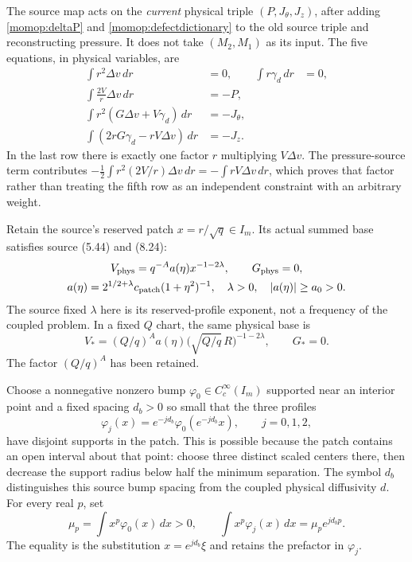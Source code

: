 \documentclass[11pt]{article}
\begin{document}
The source map acts on the \emph{current} physical triple
$(P,J_\theta,J_z)$, after adding \eqref{momop:deltaP} and
\eqref{momop:defectdictionary} to the old source triple and
reconstructing pressure. It does not take
$(M_2,M_1)$ as its input. The five equations, in physical variables, are
\begin{align}
 \int r^2\Delta v\,dr&=0,&
 \int r\gamma_d\,dr&=0,\nonumber\\
 \int\frac{2V}{r}\Delta v\,dr&=-P,\nonumber\\
 \int r^2(G\Delta v+V\gamma_d)\,dr&=-J_\theta,\nonumber\\
 \int(2rG\gamma_d-rV\Delta v)\,dr&=-J_z .
 \label{momop:fivephysical}
\end{align}
In the last row there is exactly one factor $r$ multiplying $V\Delta v$.
The pressure-source term contributes
$-\tfrac12\int r^2(2V/r)\Delta v\,dr=-\int rV\Delta v\,dr$,
which proves that factor rather than treating the fifth row as an
independent constraint with an arbitrary weight.

Retain the source's reserved patch $x=r/\sqrt q\in I_m$. Its actual
summed base satisfies source (5.44) and (8.24):
\[
\begin{gathered}
 V_{\rm phys}=q^{-A}a(\eta)x^{-1-2\lambda},\qquad
 G_{\rm phys}=0,\\
 a(\eta)=2^{1/2+\lambda}c_{\rm patch}(1+\eta^2)^{-1},
 \quad \lambda>0,\quad |a(\eta)|\ge a_0>0.
\end{gathered}
\]
The source fixed $\lambda$ here is its reserved-profile exponent,
not a frequency of the coupled problem. In a fixed $Q$ chart,
the same physical base is
\[
 V_*=(Q/q)^A a(\eta)\bigl(\sqrt{Q/q}\,R\bigr)^{-1-2\lambda},
 \qquad G_*=0.
\]
The factor $(Q/q)^A$ has been retained.

Choose a nonnegative nonzero bump $\varphi_0\in C_c^\infty(I_m)$
supported near an interior point and a fixed spacing $d_b>0$ so small
that the three profiles
\[
 \varphi_j(x)=e^{-jd_b}\varphi_0(e^{-jd_b}x),\qquad j=0,1,2,
\]
have disjoint supports in the patch. This is possible because the patch
contains an open interval about that point: choose three distinct
scaled centers there, then decrease the support radius below half the
minimum separation. The symbol $d_b$ distinguishes this source bump
spacing from the coupled physical diffusivity $d$.
For every real $p$, set
\[
 \mu_p=\int x^p\varphi_0(x)\,dx>0,\qquad
 \int x^p\varphi_j(x)\,dx=\mu_pe^{jd_bp}.
\]
The equality is the substitution $x=e^{jd_b}\xi$ and retains the
prefactor in $\varphi_j$.
\end{document}
